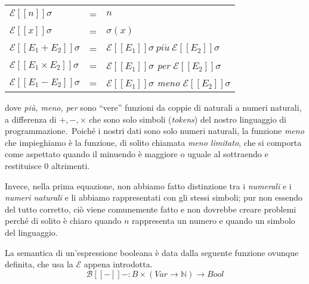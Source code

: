\begin{table}[H]
    \centering
    \begin{tabular}{l c l}
        $\mathcal{E} [\![n]\!]\sigma$             & = & $n$                                                                                  \\
        $\mathcal{E} [\![x]\!]\sigma$             & = & $\sigma(x)$                                                                          \\
        $\mathcal{E} [\![E_1+E_2]\!]\sigma$       & = & $\mathcal{E} [\![E_1]\!]\sigma\ \mathit{pi\acute{u}}\ \mathcal{E} [\![E_2]\!]\sigma$ \\
        $\mathcal{E} [\![E_1\times E_2]\!]\sigma$ & = & $\mathcal{E} [\![E_1]\!]\sigma$ \textit{per} $\mathcal{E} [\![E_2]\!]\sigma$         \\
        $\mathcal{E} [\![E_1 - E_2]\!]\sigma$     & = & $\mathcal{E} [\![E_1]\!]\sigma$ \textit{meno} $\mathcal{E} [\![E_2]\!]\sigma$        \\
    \end{tabular}
\end{table}

\noindent dove \textit{più, meno, per} sono ``vere'' funzioni da coppie di naturali a numeri naturali, a differenza di $+,-,\times$ che sono solo simboli (\textit{tokens}) del nostro linguaggio di programmazione.\
Poiché i nostri dati sono solo numeri naturali, la funzione \textit{meno} che impieghiamo è la funzione, di solito chiamata \textit{meno limitato}, che si comporta come aspettato quando il minuendo è maggiore o uguale al sottraendo e restituisce 0 altrimenti.\

Invece, nella prima equazione, non abbiamo fatto distinzione tra i \textit{numerali} e i \textit{numeri naturali} e li abbiamo rappresentati con gli stessi simboli; pur non essendo del tutto corretto, ciò viene comunemente fatto e non dovrebbe creare problemi perché di solito è chiaro quando $n$ rappresenta un numero e quando un simbolo del linguaggio.

\medskip

\noindent La semantica di un'espressione booleana è data dalla seguente funzione ovunque definita, che usa la $\mathcal{E}$ appena introdotta.
\[\mathcal{B} [\![-]\!]- : B \times (\mathit{Var} \rightarrow \mathbb{N})\rightarrow\mathit{Bool}\]

